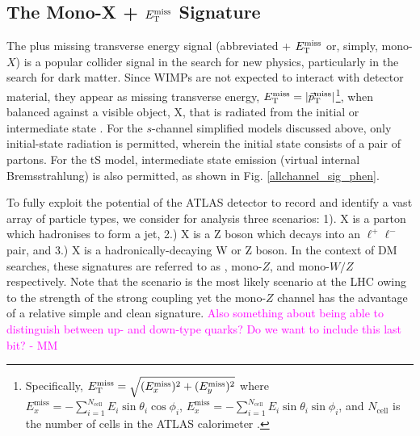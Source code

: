 \subsection{The Mono-X + $E_{\mathrm{T}}^{\mathrm{miss}}$ Signature}
The \monoX plus missing transverse energy signal (abbreviated \monoX + $E_{\mathrm{T}}^{\mathrm{miss}}$ or, simply, mono-$X$) is a popular collider signal in the search for new physics, particularly in the search for dark matter. Since WIMPs are not expected to interact with detector material, they appear as missing transverse energy, $E_{\mathrm{T}}^{\mathrm{miss}} = |\vec{p}_{\mathrm{T}}^{\mathrm{miss}}|$\footnote{Specifically, $E_{\mathrm{T}}^{\mathrm{miss}} = \sqrt{(E_{x}^{\mathrm{miss}})^{2} + (E_{y}^{\mathrm{miss}})^{2}}$ where $E_{x}^{\mathrm{miss}} = -\sum_{i=1}^{N_{\mathrm{cell}}} E_{i}\sin\theta_{i}\cos\phi_{i}$, $E_{x}^{\mathrm{miss}} = -\sum_{i=1}^{N_{\mathrm{cell}}} E_{i}\sin\theta_{i}\sin\phi_{i}$, and $N_{\mathrm{cell}}$ is the number of cells in the ATLAS calorimeter \cite{1742-6596-293-1-012064}.}, when balanced against a visible object, X, that is radiated from the initial or intermediate state \cite{some MET definition/discussion paper}. For the $s$-channel simplified models discussed above, only initial-state radiation is permitted, wherein the initial state consists of a pair of partons. For the tS model, intermediate state emission (virtual internal Bremsstrahlung) is also permitted, as shown in Fig. \ref{allchannel_sig_phen}.

To fully exploit the potential of the ATLAS detector to record and identify a vast array of particle types, we consider for analysis three scenarios: 1). X is a parton which hadronises to form a jet, 2.) X is a Z boson which decays into an $\ell^+ \ell^-$ pair, and 3.) X is a hadronically-decaying W or Z boson. In the context of DM searches, these signatures are referred to as \monojet, mono-$Z$, and mono-$W/Z$ respectively. Note that the \monojet scenario is the most likely scenario at the LHC owing to the strength of the strong coupling yet the mono-$Z$ channel has the advantage of a relative simple and clean signature. \textcolor{magenta}{Also something about \monoZ being able to distinguish between up- and down-type quarks? Do we want to include this last bit? - MM}

